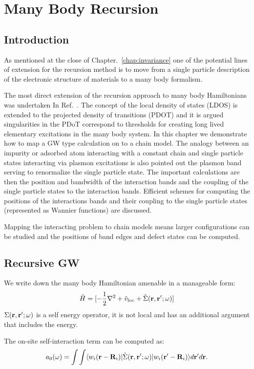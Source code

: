 \chapter{Many Body Recursion}
\label{chap:manybodyrecursion}
\section{Introduction}
As mentioned at the close of Chapter.~\ref{chap:invariance} one of the potential
lines of extension for the recursion method is to move from a single particle 
description of the electronic structure of materials to a many body formalism.

The most direct extension of the recursion approach to many body Hamiltonians 
was undertaken In Ref.~\cite{annett94}. The concept of the local density of states (LDOS)
is extended to the projected density of transitions (PDOT) and it is argued singularities
in the PDoT correspond to thresholds for creating long lived elementary excitations 
in the many body system. In this chapter we demonstrate how to map a GW type calculation
on to a chain model. The analogy between an impurity or adsorbed atom interacting with
a constant chain and single particle states interacting via plasmon excitations is 
also pointed out the plasmon band serving to renormalize the single particle state.
The important calculations are then the position and bandwidth of the interaction
bands and the coupling of the single particle states to the interaction bands.
Efficient schemes for computing the positions of the interactions bands and 
their coupling to the single particle states (represented as Wannier functions)
are discussed.

Mapping the interacting problem to chain models means larger configurations can be studied
and the positions of band edges and defect states can be computed.

\section{Recursive GW}
We write down the many body Hamiltonian amenable in a manageable form:
%
\begin{equation}
\hat{H} = [-\frac{1}{2}\nabla^{2} + \tilde{v}_{\rm loc} + \hat{\Sigma}({\bf r},{\bf r}';\omega)]
\end{equation}
%
	$\Sigma({\bf r},{\bf r}';\omega)$ is a self energy operator, it is not local and 
has an additional argument that includes the energy.

The on-site self-interaction term can be computed as:
%
\begin{equation}
a_{0}(\omega) = \int\int\langle w_{i}({\bf r}-{\bf R}_{i})|\hat{\Sigma}({\bf r},{\bf r}';\omega)|w_{i}({\bf r}'-{\bf R}_{i})\rangle d{\bf r}'d{\bf r}.
\end{equation}
%

